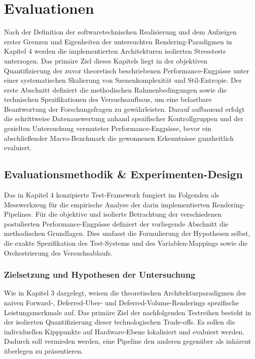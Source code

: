 \chapter{Evaluationen}
\label{ch:05_evaluation}

Nach der Definition der softwaretechnischen Realisierung und dem Aufzeigen erster Grenzen und Eigenheiten der
untersuchten Rendering-Paradigmen in Kapitel 4 werden die implementierten Architekturen isolierten Stresstests
unterzogen.
Das primäre Ziel dieses Kapitels liegt in der objektiven Quantifizierung der zuvor theoretisch beschriebenen
Performance-Engpässe unter einer systematischen Skalierung von Szenenkomplexität und Stil-Entropie.
Der erste Abschnitt definiert die methodischen Rahmenbedingungen sowie die technischen Spezifikationen des
Versuchsaufbaus, um eine belastbare Beantwortung der Forschungsfragen zu gewährleisten.
Darauf aufbauend erfolgt die schrittweise Datenauswertung anhand spezifischer Kontrollgruppen und der gezielten
Untersuchung vermuteter Performance-Engpässe, bevor ein abschließender Macro-Benchmark die gewonnenen Erkenntnisse
ganzheitlich evaluiert.


\section{Evaluationsmethodik \& Experimenten-Design}
\label{sec:0501_evaluation_methodology}

Das in Kapitel 4 konzipierte Test-Framework fungiert im Folgenden als Messwerkzeug für die empirische Analyse der darin
implementierten Rendering-Pipelines.
Für die objektive und isolierte Betrachtung der verschiedenen postulierten Performance-Engpässe definiert der
vorliegende Abschnitt die methodischen Grundlagen.
Dies umfasst die Formulierung der Hypothesen selbst, die exakte Spezifikation des Test-Systems und des
Variablen-Mappings sowie die Orchestrierung des Versuchsablaufs.

\subsection{{Zielsetzung und Hypothesen der Untersuchung}}
\label{subsec:050101_evaluation_tagets_and_hypothesis}

Wie in Kapitel 3 dargelegt, weisen die theoretischen Architekturparadigmen des naiven Forward-, Deferred-Uber- und
Deferred-Volume-Renderings spezifische Leistungsmerkmale auf.
Das primäre Ziel der nachfolgenden Testreihen besteht in der isolierten Quantifizierung dieser technologischen
Trade-offs.
Es sollen die individuellen Kipppunkte auf Hardware-Ebene lokalisiert und evaluiert werden.
Dadurch soll vermieden werden, eine Pipeline den anderen gegenüber als inhärent überlegen zu präsentieren.

